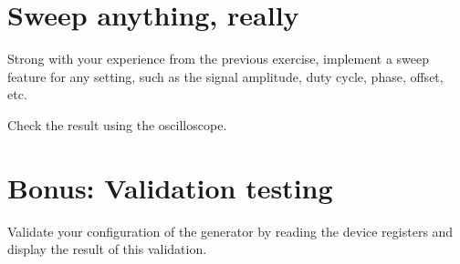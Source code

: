 \documentclass{labo}
\begin{document}
\section{Sweep anything, really}
Strong with your experience from the previous exercise, implement a sweep feature for any setting, such as the signal amplitude, duty cycle, phase, offset, etc.

Check the result using the oscilloscope.









\section{Bonus: Validation testing}
Validate your configuration of the generator by reading the device registers and display the result of this validation.









\end{document}
